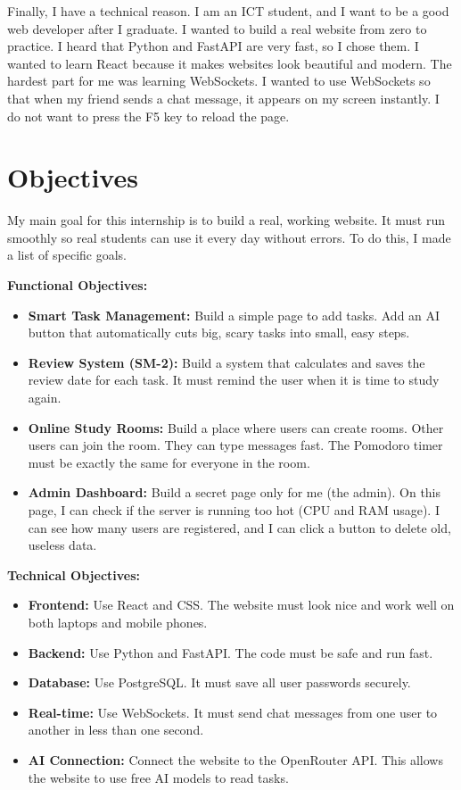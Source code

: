 \documentclass[12pt,a4paper]{report}
\begin{document}
Finally, I have a technical reason. I am an ICT student, and I want to be a good web developer after I graduate. I wanted to build a real website from zero to practice. I heard that Python and FastAPI are very fast, so I chose them. I wanted to learn React because it makes websites look beautiful and modern. The hardest part for me was learning WebSockets. I wanted to use WebSockets so that when my friend sends a chat message, it appears on my screen instantly. I do not want to press the F5 key to reload the page.

\section{Objectives}
My main goal for this internship is to build a real, working website. It must run smoothly so real students can use it every day without errors. To do this, I made a list of specific goals.

\textbf{Functional Objectives:}
\begin{itemize}
    \item \textbf{Smart Task Management:} Build a simple page to add tasks. Add an AI button that automatically cuts big, scary tasks into small, easy steps.
    \item \textbf{Review System (SM-2):} Build a system that calculates and saves the review date for each task. It must remind the user when it is time to study again.
    \item \textbf{Online Study Rooms:} Build a place where users can create rooms. Other users can join the room. They can type messages fast. The Pomodoro timer must be exactly the same for everyone in the room.
    \item \textbf{Admin Dashboard:} Build a secret page only for me (the admin). On this page, I can check if the server is running too hot (CPU and RAM usage). I can see how many users are registered, and I can click a button to delete old, useless data.
\end{itemize}

\textbf{Technical Objectives:}
\begin{itemize}
    \item \textbf{Frontend:} Use React and CSS. The website must look nice and work well on both laptops and mobile phones.
    \item \textbf{Backend:} Use Python and FastAPI. The code must be safe and run fast.
    \item \textbf{Database:} Use PostgreSQL. It must save all user passwords securely.
    \item \textbf{Real-time:} Use WebSockets. It must send chat messages from one user to another in less than one second.
    \item \textbf{AI Connection:} Connect the website to the OpenRouter API. This allows the website to use free AI models to read tasks.
\end{itemize}
\end{document}
